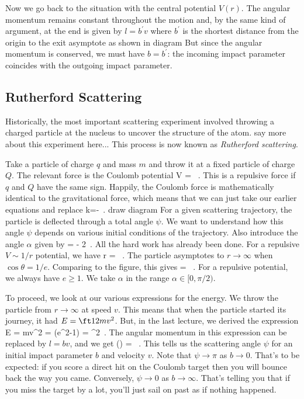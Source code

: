 {\para
Now we go back to the situation with the central potential $V(r)$. The angular momentum remains constant throughout the motion and, by the same kind of argument, at the end is given by $l=b^\prime v$ where $b^\prime$ is the shortest distance from the origin to the exit asymptote as shown in diagram But since the angular momentum is conserved, we must have $b = b^\prime$: the incoming impact parameter coincides with the outgoing impact parameter. 



\subsection*{Rutherford Scattering}

Historically, the most important scattering experiment involved throwing a charged particle at the nucleus to uncover the structure of the atom. {\cblue say more about this experiment here...} This process is now known as {\it Rutherford scattering}.


\para
Take a particle of charge $q$ and mass $m$ and throw it at a fixed particle of charge $Q$. The relevant force is the Coulomb potential
%
\be V = \ .\ee
%
This is a repulsive force if $q$ and $Q$ have the same sign. Happily, the Coulomb force is mathematically identical to the gravitational force, which means that we can just take our earlier equations and replace 
%
\be k=-\ .\ee
%
{\cblue draw diagram} For a given scattering trajectory, the particle is deflected through a total angle $\psi$. We want to understand how this angle $\psi$ depends on various initial conditions of the trajectory.  Also introduce the  angle $\alpha$ given by 
%
\be \psi = \pi - 2\alpha\ .\label{phialpha}\ee
%
All the hard work has already been done.   For a repulsive $V\sim 1/r$ potential, we have
%
\be r = \ .\ee
%
The  particle asymptotes to $r\rightarrow \infty$ when $\cos\theta=1/e$. Comparing to the figure, this gives
%
\be \cos\alpha = \ . \label{scatalpha}\ee
%
For a repulsive potential, we always have $e\geq 1$. We take $\alpha$ in the range $\alpha \in [0,\pi/2)$. 

\para
To proceed, we look at our various expressions for the  energy. We throw the particle from $r\rightarrow\infty$ at speed $v$. This means that when the particle started its journey, it had $E=\ft12 m v^2$.   But, in the last lecture, we derived the expression
%
\be E = mv^2 =  (e^2-1) = \tan^2\alpha\ . \ee
%
The angular momentum in this expression can be replaced by $l=bv$, and we get
%
\be \tan\left(\right) = \ .\label{nottissue}\ee
%
This tells us the scattering angle $\psi$ for an initial impact parameter $b$ and velocity $v$. Note that $\psi\rightarrow \pi$ as $b\rightarrow 0$. That's to be expected: if you score a direct hit on the Coulomb target then you will bounce back the way you came. Conversely, $\psi\rightarrow 0$ as $b\rightarrow \infty$. That's telling you that if you miss the target by a lot, you'll just sail on past as if nothing happened. }




